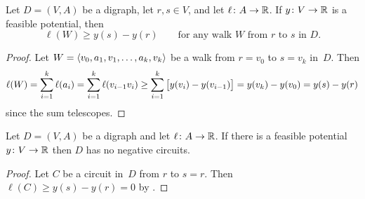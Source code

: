 \documentclass[10pt,reqno]{amsart}
\begin{document}
\begin{theorem}
  \label{thm:1}
  Let \(D = (V,A)\) be a digraph, let \(r,s \in V\), and let
  \(\ell \colon A \to \Reals\).  If \(y \colon V \to \Reals\) is a
  feasible potential, then
  \begin{equation}
    \label{eq:5}
    \ell(W) \geq y(s) - y(r)
    \qquad
    \text{for any walk~\(W\) from~\(r\) to~\(s\) in~\(D\)}.
  \end{equation}
\end{theorem}
\begin{proof}
  Let \(W = \seq{v_0,a_1,v_1,\dotsc,a_k,v_k}\) be a walk from
  \(r = v_0\) to \(s = v_k\) in~\(D\).  Then
  \begin{equation*}
    \ell(W)
    =
    \sum_{i=1}^k \ell(a_i)
    =
    \sum_{i=1}^k \ell(v_{i-1}v_i)
    \geq
    \sum_{i=1}^k \sqbrac[\big]{y(v_i)-y(v_{i-1})}
    =
    y(v_k) - y(v_0)
    =
    y(s) - y(r)
  \end{equation*}
  since the sum telescopes.
\end{proof}

\begin{corollary}
  Let \(D = (V,A)\) be a digraph and let \(\ell \colon A \to \Reals\).
  If there is a feasible potential \(y \colon V \to \Reals\) then
  \(D\) has no negative circuits.
\end{corollary}
\begin{proof}
  Let \(C\) be a circuit in~\(D\) from \(r\) to \(s = r\).  Then
  \(\ell(C) \geq y(s) - y(r) = 0\) by .
\end{proof}

\nocite{CookCPS98a,Schrijver03a}

\begingroup
\printbibliography
\endgroup
\end{document}
